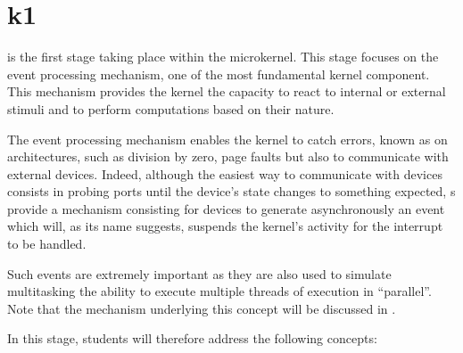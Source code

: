 %
%
%
%
%
%

%
%

\chapter{k1}
\label{chapter:k1}

 is the first stage taking place within the 
microkernel. This stage focuses on the event processing mechanism, one of
the most fundamental kernel component. This mechanism provides the kernel
the capacity to react to internal or external stimuli and to perform
computations based on their nature.

The event processing mechanism enables the kernel to catch errors, known
as  on  architectures, such as division by
zero, page faults \etc{} but also to communicate with external devices.
Indeed, although the easiest way to communicate with devices consists in
probing  ports until the device's state changes to something
expected, s provide a mechanism consisting for devices
to generate asynchronously an event which will, as its name suggests, suspends
the kernel's activity for the interrupt to be handled.

Such events are extremely important as they are also used to simulate
multitasking \ie{} the ability to execute multiple threads of execution
in ``parallel''. Note that the mechanism underlying this concept will be
discussed in .

In this stage, students will therefore address the following concepts:

